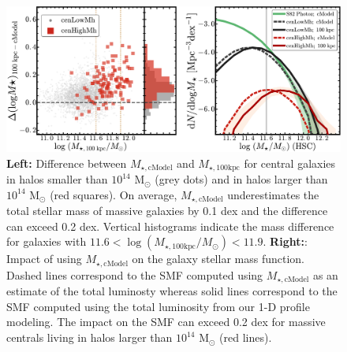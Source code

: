\documentclass{emulateapj}
\def\rbcg{\texttt{cenHighMh}}
\def\nbcg{\texttt{cenLowMh}}
\def\mstar{{$M_{\star}$}}
\def\logms{{$\log (M_{\star}/M_{\odot})$}}
\def\mtot{{$M_{\star,100\mathrm{kpc}}$}}
\def\mcmodel{{$M_{\star,\mathrm{cModel}}$}}
\def\logmtot{{$\log (M_{\star,100\mathrm{kpc}}/M_{\odot})$}}
\begin{document}
\begin{CJK*}{UTF8}{gbsn}
  \begin{figure}[bt!]
      \centering 
      \includegraphics[width=\textwidth]{fig/redbcg_smf_new}
      \caption{\textbf{Left:} Difference between \mcmodel{} and \mtot{} for central
      	galaxies in halos smaller than $10^{14}$ M$_{\odot}$ (grey dots) and in
        halos larger than $10^{14}$ M$_{\odot}$ (red squares). 
        On average, \mcmodel{} underestimates the total stellar mass of massive 
        galaxies by 0.1 dex and the difference can exceed 0.2 dex. 
        Vertical histograms indicate the mass difference for galaxies with
        $11.6<$\logmtot{}$<11.9$. 
        \textbf{Right:}: Impact of using \mcmodel{} on the galaxy stellar mass
        function. 
        Dashed lines correspond to the SMF computed using \mcmodel{} as an estimate
        of the total luminosty whereas solid lines correspond to the SMF computed
        using the total luminosity from our 1-D profile modeling. 
        The impact on the SMF can exceed 0.2 dex for massive centrals living in
        halos larger than $10^{14}$ M$_{\odot}$ (red lines).}
      \label{fig:smf1}
  \end{figure}
  
          
 

\end{CJK*}
\end{document}
